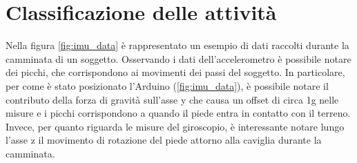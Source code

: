 \clearpage

\section{Classificazione delle attività} \label{classifSect}
Nella figura \ref{fig:imu_data} è rappresentato un esempio di dati raccolti durante la camminata di un soggetto. Osservando i dati dell'accelerometro è possibile notare dei picchi, che corrispondono ai movimenti dei passi del soggetto. In particolare, per come è stato posizionato l'Arduino (\Fig\ref{fig:imu_data}), è possibile notare il contributo della forza di gravità sull'asse y che causa un offset di circa 1g nelle misure e i picchi corrispondono a quando il piede entra in contatto con il terreno. Invece, per quanto riguarda le misure del giroscopio, è interessante notare lungo l'asse z il movimento di rotazione del piede attorno alla caviglia durante la camminata. 

